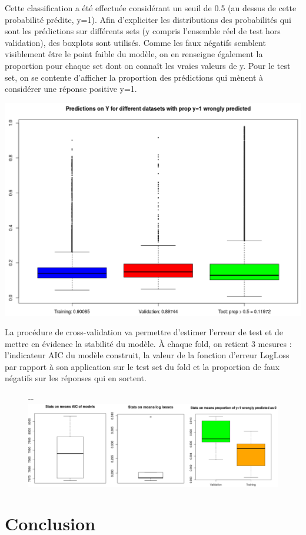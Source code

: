 \documentclass[]{article}
\begin{document}
Cette classification a été effectuée considérant un seuil de 0.5 (au dessus de cette probabilité prédite, y=1). Afin d'expliciter les distributions des probabilités qui sont les prédictions sur différents sets (y compris l'ensemble réel de test hors validation), des boxplots sont utilisés. Comme les faux négatifs semblent visiblement être le point faible du modèle, on en renseigne également la proportion pour chaque set dont on connaît les vraies valeurs de y. Pour le test set, on se contente d'afficher la proportion des prédictions qui mènent à considérer une réponse positive y=1.
\begin{center}
\includegraphics[scale=0.35]{pred_distrib}
\end{center}


La procédure de cross-validation va permettre d'estimer l'erreur de test et de mettre en évidence la stabilité du modèle. À chaque fold, on retient 3 mesures : l'indicateur AIC du modèle construit, la valeur de la fonction d'erreur LogLoss par rapport à son application sur le test set du fold et la proportion de faux négatifs sur les réponses qui en sortent.

\begin{figure}[!ht]
   \begin{adjustwidth}{-\oddsidemargin-1in}{-\rightmargin}
     \centering
     \includegraphics[width=\textwidth + 1cm]{cv}
   \end{adjustwidth}
\end{figure}

\section{Conclusion}
\end{document}
